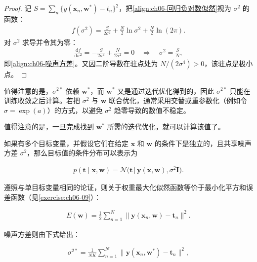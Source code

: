\documentclass[../../main.tex]{subfiles}
\begin{document}
\begin{proof}
记 $S=\sum_{n}\{y(\boldsymbol{x}_n,\boldsymbol{w}^{\ast})-t_n\}^{2}$，把\eqref{align:ch06-回归负对数似然}视为 $\sigma^{2}$ 的函数：
\begin{align}
f(\sigma^{2})=\frac{S}{2\sigma^{2}}+\frac{N}{2}\ln\sigma^{2}+\frac{N}{2}\ln(2\pi).
\end{align}
对 $\sigma^{2}$ 求导并令其为零：
\begin{align}
\frac{\mathrm{d}f}{\mathrm{d}\sigma^{2}}=-\frac{S}{2\sigma^{4}}+\frac{N}{2\sigma^{2}}=0
\quad\Longrightarrow\quad \sigma^{2}=\frac{S}{N},
\end{align}
即\eqref{align:ch06-噪声方差}。又因二阶导数在驻点处为 $N/(2\sigma^{4})>0$，该驻点是极小点。
\end{proof}

\begin{remark}值得注意的是，$\sigma^{2\ast}$ 依赖 $\boldsymbol{w}^{\ast}$，而 $\boldsymbol{w}^{\ast}$ 又是通过迭代优化得到的，因此 $\sigma^{2\ast}$ 只能在训练收敛之后计算。若把 $\sigma^{2}$ 与 $\boldsymbol{w}$ 联合优化，通常采用交替或重参数化（例如令 $\sigma=\exp(a)$）的方式，以避免 $\sigma^{2}$ 趋零导致的数值不稳定。
\end{remark}

值得注意的是，一旦完成找到 $\boldsymbol{w}^{\ast}$ 所需的迭代优化，就可以计算该值了。

如果有多个目标变量，并假设它们在给定 $\boldsymbol{x}$ 和 $\boldsymbol{w}$ 的条件下是独立的，且共享噪声方差 $\sigma^{2}$，那么目标值的条件分布可以表示为

\begin{align}
p(\boldsymbol{t}\mid\boldsymbol{x},\boldsymbol{w})=\mathcal{N}\bigl(\boldsymbol{t}\,\big|\,\boldsymbol{y}(\boldsymbol{x},\boldsymbol{w}),\sigma^{2}\boldsymbol{I}\bigr).
\label{align:ch06-多输出条件Gauss}
\end{align}

遵照与单目标变量相同的论证，则关于权重最大化似然函数等价于最小化平方和误差函数（见\cref{exercise:ch06-09}）：

\begin{align}
E(\boldsymbol{w})=\frac{1}{2}\sum_{n=1}^{N}\bigl\|\boldsymbol{y}(\boldsymbol{x}_n,\boldsymbol{w})-\boldsymbol{t}_n\bigr\|^{2}.
\label{align:ch06-多输出平方和}
\end{align}

噪声方差则由下式给出：

\begin{align}
\sigma^{2\ast}=\frac{1}{NK}\sum_{n=1}^{N}\bigl\|\boldsymbol{y}(\boldsymbol{x}_n,\boldsymbol{w}^{\ast})-\boldsymbol{t}_n\bigr\|^{2},
\label{align:ch06-多输出噪声方差}
\end{align}
\end{document}
